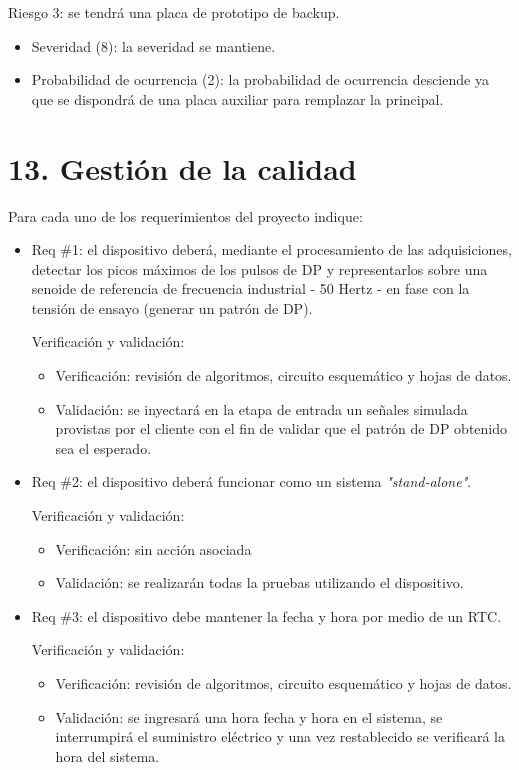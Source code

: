 \documentclass[11pt]{charter}
\begin{document}
Riesgo 3: se tendrá una placa de prototipo de backup.
\begin{itemize}  
\item Severidad (8): la severidad se mantiene.
\item Probabilidad de ocurrencia (2): la probabilidad de ocurrencia desciende ya que se dispondrá de una placa auxiliar para remplazar la principal.
\end{itemize}


\section{13. Gestión de la calidad}
\label{sec:calidad}

Para cada uno de los requerimientos del proyecto indique:
\begin{itemize} 
\item Req \#1: el dispositivo deberá, mediante el procesamiento de las adquisiciones, detectar los picos máximos de los pulsos de DP y representarlos sobre una senoide de referencia de frecuencia industrial - 50 Hertz - en fase con la tensión de ensayo (generar un patrón de DP).

Verificación y validación:

\begin{itemize}
\item Verificación: revisión de algoritmos, circuito esquemático y hojas de datos.
\item Validación: se inyectará en la etapa de entrada un señales simulada provistas por el cliente con el fin de validar que el patrón de DP obtenido sea el esperado.
\end{itemize}

\item Req \#2: el dispositivo deberá funcionar como un sistema \textit{"stand-alone"}.

Verificación y validación:

\begin{itemize}
\item Verificación: sin acción asociada
\item Validación: se realizarán todas la pruebas utilizando el dispositivo.
\end{itemize}

\item Req \#3: el dispositivo debe mantener la fecha y hora por medio de un RTC.

Verificación y validación:

\begin{itemize}
\item Verificación: revisión de algoritmos, circuito esquemático y hojas de datos.
\item Validación: se ingresará una hora fecha y hora en el sistema, se interrumpirá el suministro eléctrico y una vez restablecido se verificará la hora del sistema.
\end{itemize}


\end{itemize}
\end{document}
